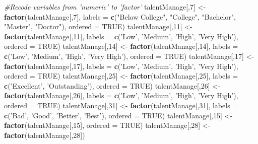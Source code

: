 \documentclass[]{article}
\newenvironment{Shaded}{\begin{snugshade}}{\end{snugshade}}
\newcommand{\KeywordTok}[1]{\textcolor[rgb]{0.13,0.29,0.53}{\textbf{{#1}}}}
\newcommand{\DataTypeTok}[1]{\textcolor[rgb]{0.13,0.29,0.53}{{#1}}}
\newcommand{\DecValTok}[1]{\textcolor[rgb]{0.00,0.00,0.81}{{#1}}}
\newcommand{\StringTok}[1]{\textcolor[rgb]{0.31,0.60,0.02}{{#1}}}
\newcommand{\CommentTok}[1]{\textcolor[rgb]{0.56,0.35,0.01}{\textit{{#1}}}}
\newcommand{\OtherTok}[1]{\textcolor[rgb]{0.56,0.35,0.01}{{#1}}}
\newcommand{\NormalTok}[1]{{#1}}
\begin{document}
\begin{Shaded}
\begin{Highlighting}[]
\CommentTok{#Recode variables from 'numeric' to 'factor'}
\NormalTok{talentManage[,}\DecValTok{7}\NormalTok{] <-}\StringTok{ }\KeywordTok{factor}\NormalTok{(talentManage[,}\DecValTok{7}\NormalTok{], }\DataTypeTok{labels =} \KeywordTok{c}\NormalTok{(}\StringTok{"Below College"}\NormalTok{, }\StringTok{"College"}\NormalTok{, }\StringTok{"Bachelor"}\NormalTok{, }\StringTok{"Master"}\NormalTok{, }\StringTok{"Doctor"}\NormalTok{), }\DataTypeTok{ordered =} \OtherTok{TRUE}\NormalTok{)}
\NormalTok{talentManage[,}\DecValTok{11}\NormalTok{] <-}\StringTok{ }\KeywordTok{factor}\NormalTok{(talentManage[,}\DecValTok{11}\NormalTok{], }\DataTypeTok{labels =} \KeywordTok{c}\NormalTok{(}\StringTok{'Low'}\NormalTok{, }\StringTok{'Medium'}\NormalTok{, }\StringTok{'High'}\NormalTok{, }\StringTok{'Very High'}\NormalTok{), }\DataTypeTok{ordered =} \OtherTok{TRUE}\NormalTok{)}
\NormalTok{talentManage[,}\DecValTok{14}\NormalTok{] <-}\StringTok{ }\KeywordTok{factor}\NormalTok{(talentManage[,}\DecValTok{14}\NormalTok{], }\DataTypeTok{labels =} \KeywordTok{c}\NormalTok{(}\StringTok{'Low'}\NormalTok{, }\StringTok{'Medium'}\NormalTok{, }\StringTok{'High'}\NormalTok{, }\StringTok{'Very High'}\NormalTok{), }\DataTypeTok{ordered =} \OtherTok{TRUE}\NormalTok{)}
\NormalTok{talentManage[,}\DecValTok{17}\NormalTok{] <-}\StringTok{ }\KeywordTok{factor}\NormalTok{(talentManage[,}\DecValTok{17}\NormalTok{], }\DataTypeTok{labels =} \KeywordTok{c}\NormalTok{(}\StringTok{'Low'}\NormalTok{, }\StringTok{'Medium'}\NormalTok{, }\StringTok{'High'}\NormalTok{, }\StringTok{'Very High'}\NormalTok{), }\DataTypeTok{ordered =} \OtherTok{TRUE}\NormalTok{)}
\NormalTok{talentManage[,}\DecValTok{25}\NormalTok{] <-}\StringTok{ }\KeywordTok{factor}\NormalTok{(talentManage[,}\DecValTok{25}\NormalTok{], }\DataTypeTok{labels =} \KeywordTok{c}\NormalTok{(}\StringTok{'Excellent'}\NormalTok{, }\StringTok{'Outstanding'}\NormalTok{), }\DataTypeTok{ordered =} \OtherTok{TRUE}\NormalTok{)}
\NormalTok{talentManage[,}\DecValTok{26}\NormalTok{] <-}\StringTok{ }\KeywordTok{factor}\NormalTok{(talentManage[,}\DecValTok{26}\NormalTok{], }\DataTypeTok{labels =} \KeywordTok{c}\NormalTok{(}\StringTok{'Low'}\NormalTok{, }\StringTok{'Medium'}\NormalTok{, }\StringTok{'High'}\NormalTok{, }\StringTok{'Very High'}\NormalTok{), }\DataTypeTok{ordered =} \OtherTok{TRUE}\NormalTok{)}
\NormalTok{talentManage[,}\DecValTok{31}\NormalTok{] <-}\StringTok{ }\KeywordTok{factor}\NormalTok{(talentManage[,}\DecValTok{31}\NormalTok{], }\DataTypeTok{labels =} \KeywordTok{c}\NormalTok{(}\StringTok{'Bad'}\NormalTok{, }\StringTok{'Good'}\NormalTok{, }\StringTok{'Better'}\NormalTok{, }\StringTok{'Best'}\NormalTok{), }\DataTypeTok{ordered =} \OtherTok{TRUE}\NormalTok{)}
\NormalTok{talentManage[,}\DecValTok{15}\NormalTok{] <-}\StringTok{ }\KeywordTok{factor}\NormalTok{(talentManage[,}\DecValTok{15}\NormalTok{], }\DataTypeTok{ordered =} \OtherTok{TRUE}\NormalTok{)}
\NormalTok{talentManage[,}\DecValTok{28}\NormalTok{] <-}\StringTok{ }\KeywordTok{factor}\NormalTok{(talentManage[,}\DecValTok{28}\NormalTok{])}


\end{Highlighting}
\end{Shaded}
\end{document}
